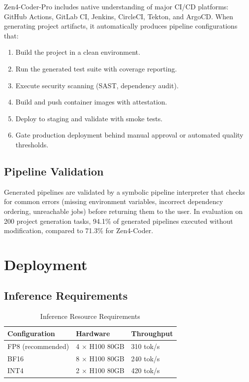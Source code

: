 \documentclass[11pt,a4paper]{article}
\begin{document}
Zen4-Coder-Pro includes native understanding of major CI/CD platforms: GitHub Actions, GitLab CI, Jenkins, CircleCI, Tekton, and ArgoCD. When generating project artifacts, it automatically produces pipeline configurations that:

\begin{enumerate}
  \item Build the project in a clean environment.
  \item Run the generated test suite with coverage reporting.
  \item Execute security scanning (SAST, dependency audit).
  \item Build and push container images with attestation.
  \item Deploy to staging and validate with smoke tests.
  \item Gate production deployment behind manual approval or automated quality thresholds.
\end{enumerate}

\subsection{Pipeline Validation}

Generated pipelines are validated by a symbolic pipeline interpreter that checks for common errors (missing environment variables, incorrect dependency ordering, unreachable jobs) before returning them to the user. In evaluation on 200 project generation tasks, 94.1\% of generated pipelines executed without modification, compared to 71.3\% for Zen4-Coder.

\section{Deployment}

\subsection{Inference Requirements}

\begin{table}[H]
\centering
\caption{Inference Resource Requirements}
\begin{tabular}{lll}
\toprule
\textbf{Configuration} & \textbf{Hardware} & \textbf{Throughput} \\
\midrule
FP8 (recommended) & 4 $\times$ H100 80GB & 310 tok/s \\
BF16 & 8 $\times$ H100 80GB & 240 tok/s \\
INT4 & 2 $\times$ H100 80GB & 420 tok/s \\
\bottomrule
\end{tabular}
\end{table}
\end{document}
